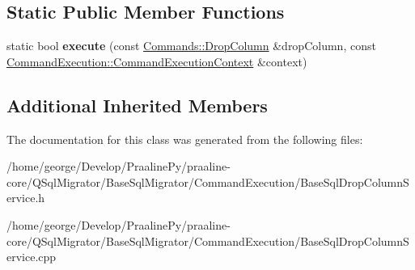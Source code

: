 \subsection*{Static Public Member Functions}
\begin{DoxyCompactItemize}
\item 
\mbox{\label{class_q_sql_migrator_1_1_command_execution_1_1_base_sql_drop_column_service_ab49258a761b5a2a5f8aef957ba86c653}} 
static bool {\bfseries execute} (const \hyperlink{class_q_sql_migrator_1_1_commands_1_1_drop_column}{Commands\+::\+Drop\+Column} \&drop\+Column, const \hyperlink{class_q_sql_migrator_1_1_command_execution_1_1_command_execution_context}{Command\+Execution\+::\+Command\+Execution\+Context} \&context)
\end{DoxyCompactItemize}
\subsection*{Additional Inherited Members}


The documentation for this class was generated from the following files\+:\begin{DoxyCompactItemize}
\item 
/home/george/\+Develop/\+Praaline\+Py/praaline-\/core/\+Q\+Sql\+Migrator/\+Base\+Sql\+Migrator/\+Command\+Execution/Base\+Sql\+Drop\+Column\+Service.\+h\item 
/home/george/\+Develop/\+Praaline\+Py/praaline-\/core/\+Q\+Sql\+Migrator/\+Base\+Sql\+Migrator/\+Command\+Execution/Base\+Sql\+Drop\+Column\+Service.\+cpp\end{DoxyCompactItemize}
